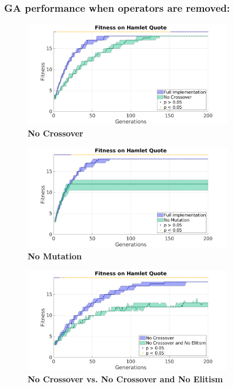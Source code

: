 \documentclass{article}
\begin{document}
		\subsubsection*{GA performance when operators are removed:}
		\hspace{-5mm}
		\begin{figure}[h!]

		\includegraphics[width=0.8\textwidth]{img/2_vsNoCross.png}
		\caption
		{
			\textbf{No Crossover}}
		\end{figure}
				\hspace{-5mm}
		\begin{figure}[h!]

		\includegraphics[width=0.8\textwidth]{img/3_vsNoMut.png}
			\caption
			{			\textbf{ No Mutation}}
			\end{figure}
					\hspace{-5mm}
\begin{figure}[h!]

		\includegraphics[width=0.8\textwidth]{img/4_vsNoCrossNoElite.png}
	\caption
	{		\textbf{No Crossover vs. No Crossover and No Elitism}}
\end{figure}
\end{document}
